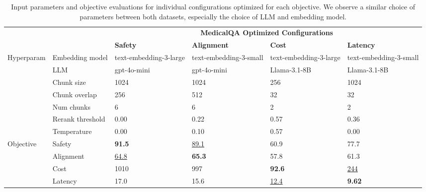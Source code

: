 \begin{table}[h]
    \begin{tabular}{l l p{1.8cm} p{1.8cm} p{1.8cm} p{1.8cm}}
    \toprule
    & & \multicolumn{4}{c}{\textbf{MedicalQA Optimized Configurations}} \\ 
    & & \textbf{Safety} & \textbf{Alignment} & \textbf{Cost} & \textbf{Latency} \\ \midrule
    \multirow{7}{*}{Hyperparam}& Embedding model & text-embedding-3-large & text-embedding-3-small & text-embedding-3-large & text-embedding-3-small\\
    & LLM & gpt-4o-mini & gpt-4o-mini & Llama-3.1-8B & Llama-3.1-8B\\
    & Chunk size & 1024 & 1024 & 256 & 1024\\
    & Chunk overlap & 256 & 512 & 32 & 32 \\
    & Num chunks & 6 & 6 & 2 & 2 \\
    & Rerank threshold & 0.00 & 0.22 & 0.57 & 0.36 \\
    & Temperature & 0.00 & 0.10 & 0.57 & 0.00 \\ \midrule
    \multirow{4}{*}{Objective} & Safety & \textbf{91.5} & \underline{89.1} & 60.9 & 77.7 \\
    & Alignment &  \underline{64.8} & \textbf{65.3} & 57.8 & 61.3 \\
    & Cost & 1010 & 997 & \textbf{92.6} & \underline{244} \\
    & Latency & 17.0 & 15.6 & \underline{12.4} & \textbf{9.62} \\
    \bottomrule
    \end{tabular}
    \caption{Input parameters and objective evaluations for individual configurations optimized for each objective. We observe a similar choice of parameters between both datasets, especially the choice of LLM and embedding model.}
    \label{tab:configurations}
\end{table}






